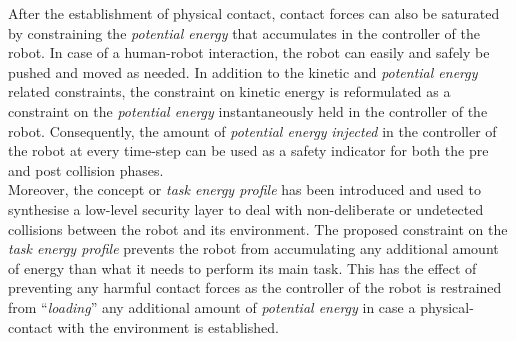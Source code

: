 After the establishment of physical contact, contact forces can also be saturated by constraining the \textit{potential energy} that accumulates in the controller of the robot. In case of a human-robot interaction, the robot can easily and safely be pushed and moved as needed. 
In addition to the kinetic and \textit{potential energy} related constraints, the constraint on kinetic energy is reformulated as a constraint on the \textit{potential energy} instantaneously held in the controller of the robot. Consequently, the amount of \textit{potential energy} \textit{injected} in the controller of the robot at every time-step can be used as a safety indicator for both the pre and post collision phases. \\
Moreover, the concept or \textit{task energy profile} has been introduced and used to synthesise a low-level security layer to deal with non-deliberate or undetected collisions between the robot and its environment. The proposed constraint on the \textit{task energy profile} prevents the robot from accumulating any additional amount of energy than what it needs to perform its main task. This has the effect of preventing any harmful contact forces as the controller of the robot is restrained from ``\textit{loading}'' any additional amount of \textit{potential energy} in case a physical-contact with the environment is established. \\
